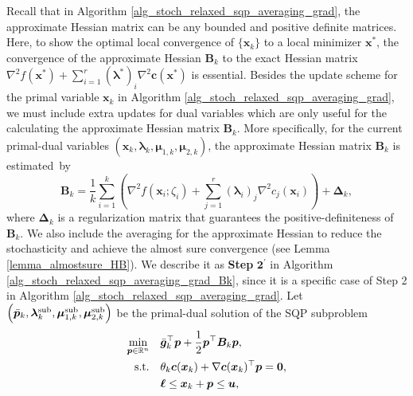 \documentclass[aos]{imsart}
\numberwithin{equation}{section}
\theoremstyle{plain}
\newcommand{\michael}[1]{\textcolor{red}{Michael:\ #1}}
\newcommand{\yihang}[1]{\textcolor{blue}{Yihang:\ #1}}
\begin{document}
Recall that in Algorithm \ref{alg_stoch_relaxed_sqp_averaging_grad}, the approximate Hessian matrix can be any bounded and positive definite matrices. Here, to show the optimal local convergence of $\{\bm{x}_k\}$ to a local minimizer $\bm{x}^{*}$, the convergence of the approximate Hessian $\bm{B}_k$ to the exact Hessian matrix $\nabla^2 f(\bm{x}^{*}) + \sum_{i=1}^{r} (\bm{\lambda}^{*})_{i} \nabla^2 \bm{c}(\bm{x}^{*})$ is essential. Besides the update scheme for the primal variable $\bm{x}_k$ in Algorithm \ref{alg_stoch_relaxed_sqp_averaging_grad}, we must include extra updates for dual variables which are only useful for the calculating the approximate Hessian matrix $\bm{B}_k$. More specifically, for the current primal-dual variables $\left(\bm{x}_k, \bm{\lambda}_k, \bm{\mu}_{1,k}, \bm{\mu}_{2,k} \right)$, the approximate Hessian matrix $\bm{B}_k$ is estimated~by 
\begin{equation*}
        \bm{B}_k = \frac{1}{k} \sum_{i=1}^{k} \left( \nabla^2 f(\bm{x}_i; \zeta_{i}) + \sum_{j=1}^{r} \left( \bm{\lambda}_{i}\right)_{j}\nabla^2 c_j(\bm{x}_{i})\right) + \bm{\Delta}_k,
\end{equation*}
 where $\bm{\Delta}_k$ is a regularization matrix that guarantees the positive-definiteness of $\bm{B}_k$. We also include the averaging for the approximate Hessian to reduce the stochasticity and achieve the almost sure convergence (see Lemma \ref{lemma_almostsure_HB}). 
We describe it as \textbf{Step} $\mathbf{2^{\prime}}$ in Algorithm \ref{alg_stoch_relaxed_sqp_averaging_grad_Bk}, since it is a specific case of Step 2 in Algorithm \ref{alg_stoch_relaxed_sqp_averaging_grad}. 
Let $\left(\Bar{\bm{p}}_k,  \bm{\lambda}_k^{\text{sub}}, \bm{\mu}_{1,k}^{\text{sub}}, \bm{\mu}_{2,k}^{\text{sub}} \right)$ be the primal-dual solution of the SQP subproblem 
 \begin{equation*}
    \begin{split}
        \min_{\bm{p} \in \mathbb{R}^{n}} & \hspace{1em} \Bar{\bm{g}}_{k}^{\top}\bm{p}+ \frac{1}{2}\bm{p}^{\top}\bm{B}_k\bm{p},\\
        \text{s.t.} & \hspace{1em} \theta_k \bm{c}(\bm{x}_k)+\nabla \bm{c}(\bm{x}_k)^{\top}\bm{p} = \bm{0},\\
        & \hspace{1em} \bm{\ell} \leq \bm{x}_k + \bm{p} \leq \bm{u},
    \end{split}    
\end{equation*} 
\end{document}
